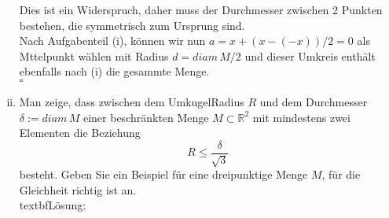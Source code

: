 \documentclass[11pt,a4paper,ngerman]{article}
\begin{document}
\begin{enumerate}[(i)]
            Dies ist ein Widerspruch, daher muss der Durchmesser zwischen 2 Punkten bestehen,
            die symmetrisch zum Ursprung sind.\\

            Nach Aufgabenteil (i), können wir nun $a= x + (x - (-x))/2 = 0$ als Mttelpunkt
            wählen mit Radius $d = diam \, M / 2$ und dieser Umkreis enthält
            ebenfalls nach (i) die gesammte Menge.\\
            \mbox{} \hfill $\square$
            

		\item Man zeige, dass zwischen dem UmkugelRadius $R$ und dem Durchmesser $\delta := diam \, M$ einer beschränkten Menge
		 $M \subset \mathbb{R}^2$ mit mindestens zwei Elementen die Beziehung
			$$
				R \leq \frac{\delta}{\sqrt{3}}
			$$
		besteht. Geben Sie ein Beispiel für eine dreipunktige Menge $M$, für die Gleichheit richtig ist an.\\
		textbf{Lösung:}\\
			
	\end{enumerate}

\label{LastPage}
\end{document}
